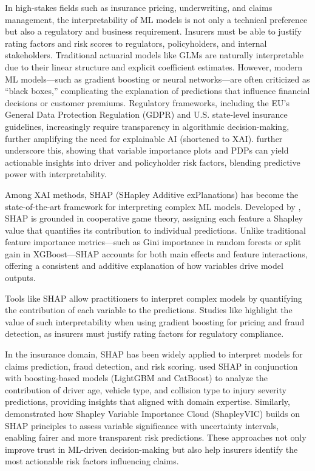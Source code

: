 \documentclass[
  number,
  review,
  3p]{elsarticle}
\begin{document}
In high-stakes fields such as insurance pricing, underwriting, and
claims management, the interpretability of ML models is not only a
technical preference but also a regulatory and business requirement.
Insurers must be able to justify rating factors and risk scores to
regulators, policyholders, and internal stakeholders. Traditional
actuarial models like GLMs are naturally interpretable due to their
linear structure and explicit coefficient estimates. However, modern ML
models---such as gradient boosting or neural networks---are often
criticized as ``black boxes,'' complicating the explanation of
predictions that influence financial decisions or customer premiums.
Regulatory frameworks, including the EU's General Data Protection
Regulation (GDPR) and U.S. state-level insurance guidelines,
increasingly require transparency in algorithmic decision-making,
further amplifying the need for explainable AI (shortened to XAI).
\citet{henckaerts} further underscore this, showing that variable
importance plots and PDPs can yield actionable insights into driver and
policyholder risk factors, blending predictive power with
interpretability.

Among XAI methods, SHAP (SHapley Additive exPlanations) has become the
state-of-the-art framework for interpreting complex ML models. Developed
by \citet{lundberg}, SHAP is grounded in cooperative game theory,
assigning each feature a Shapley value that quantifies its contribution
to individual predictions. Unlike traditional feature importance
metrics---such as Gini importance in random forests or split gain in
XGBoost---SHAP accounts for both main effects and feature interactions,
offering a consistent and additive explanation of how variables drive
model outputs.

Tools like SHAP allow practitioners to interpret complex models by
quantifying the contribution of each variable to the predictions.
Studies like \citet{mohamed} highlight the value of such
interpretability when using gradient boosting for pricing and fraud
detection, as insurers must justify rating factors for regulatory
compliance.

In the insurance domain, SHAP has been widely applied to interpret
models for claims prediction, fraud detection, and risk scoring.
\citet{dong} used SHAP in conjunction with boosting-based models
(LightGBM and CatBoost) to analyze the contribution of driver age,
vehicle type, and collision type to injury severity predictions,
providing insights that aligned with domain expertise. Similarly,
\citet{ning} demonstrated how Shapley Variable Importance Cloud
(ShapleyVIC) builds on SHAP principles to assess variable significance
with uncertainty intervals, enabling fairer and more transparent risk
predictions. These approaches not only improve trust in ML-driven
decision-making but also help insurers identify the most actionable risk
factors influencing claims.
\end{document}
